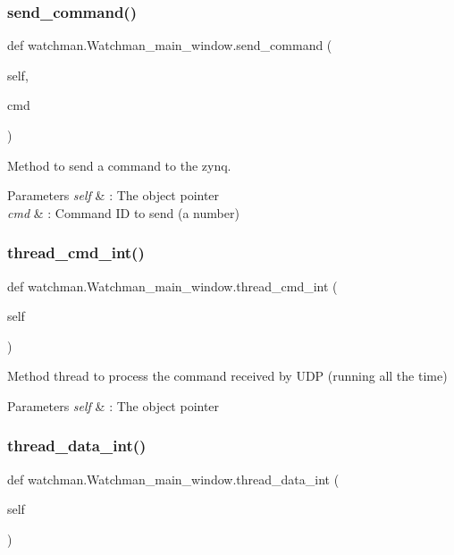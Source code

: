 \subsubsection{send\_command()}
{\footnotesize\ttfamily def watchman.\+Watchman\+\_\+main\+\_\+window.\+send\+\_\+command (\begin{DoxyParamCaption}\item[{}]{self,  }\item[{}]{cmd }\end{DoxyParamCaption})}



Method to send a command to the zynq. 


\begin{DoxyParams}{Parameters}
{\em self} & \+: The object pointer \\
\hline
{\em cmd} & \+: Command ID to send (a number) \\
\hline
\end{DoxyParams}
\mbox{\label{classwatchman_1_1_watchman__main__window_a05f6463320989b4c77eced835775d8ad}} 
\subsubsection{thread\_cmd\_int()}
{\footnotesize\ttfamily def watchman.\+Watchman\+\_\+main\+\_\+window.\+thread\+\_\+cmd\+\_\+int (\begin{DoxyParamCaption}\item[{}]{self }\end{DoxyParamCaption})}



Method thread to process the command received by U\+DP (running all the time) 


\begin{DoxyParams}{Parameters}
{\em self} & \+: The object pointer \\
\hline
\end{DoxyParams}
\mbox{\label{classwatchman_1_1_watchman__main__window_a59982ccfdd3e2145e28e9b6200ccf5ce}} 
\subsubsection{thread\_data\_int()}
{\footnotesize\ttfamily def watchman.\+Watchman\+\_\+main\+\_\+window.\+thread\+\_\+data\+\_\+int (\begin{DoxyParamCaption}\item[{}]{self }\end{DoxyParamCaption})}



